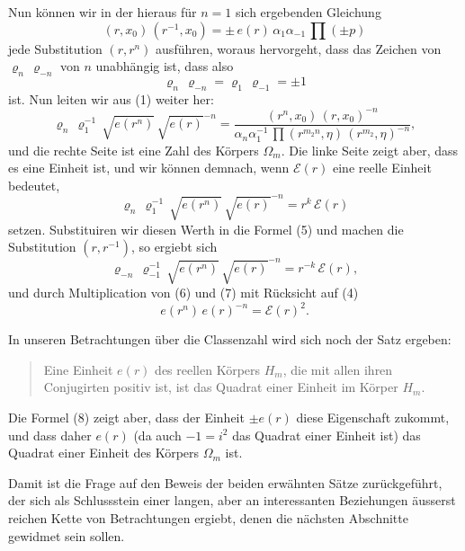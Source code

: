 \documentclass[12pt,a4paper]{article}
\begin{document}
Nun können wir in der hieraus für $n = 1$ sich ergebenden Gleichung
\[
(r, x_0)\,(r^{-1}, x_0) = \pm\,e(r)\,\alpha_1\alpha_{-1}\,\prod(\pm p)
\]
jede Substitution $(r, r^n)$ ausführen, woraus hervorgeht, dass das Zeichen von $\varrho_n\,\varrho_{-n}$ von $n$ unabhängig ist, dass also
\begin{equation}\label{eq:184-4}
\varrho_n\,\varrho_{-n} = \varrho_1\,\varrho_{-1} = \pm 1
\end{equation}
ist. Nun leiten wir aus (1) weiter her:
\begin{equation}\label{eq:184-5}
\varrho_n\,\varrho_1^{-1}\,\sqrt{e(r^n)}\,\sqrt{e(r)}^{-n} = \frac{(r^n, x_0)\,(r, x_0)^{-n}}{\alpha_n\alpha_1^{-1}\,\prod(r^{m_2 n}, \eta)\,(r^{m_2}, \eta)^{-n}},
\end{equation}
und die rechte Seite ist eine Zahl des Körpers $\Omega_m$. Die linke Seite zeigt aber, dass es eine Einheit ist, und wir können demnach, wenn $\mathcal{E}(r)$ eine reelle Einheit bedeutet,
\begin{equation}\label{eq:184-6}
\varrho_n\,\varrho_1^{-1}\,\sqrt{e(r^n)}\,\sqrt{e(r)}^{-n} = r^k\,\mathcal{E}(r)
\end{equation}
setzen. Substituiren wir diesen Werth in die Formel (5) und machen die Substitution $(r, r^{-1})$, so ergiebt sich
\begin{equation}\label{eq:184-7}
\varrho_{-n}\,\varrho_{-1}^{-1}\,\sqrt{e(r^n)}\,\sqrt{e(r)}^{-n} = r^{-k}\,\mathcal{E}(r),
\end{equation}
und durch Multiplication von (6) und (7) mit Rücksicht auf (4)
\begin{equation}\label{eq:184-8}
e(r^n)\,e(r)^{-n} = \mathcal{E}(r)^2.
\end{equation}

In unseren Betrachtungen über die Classenzahl wird sich noch der Satz ergeben:

\begin{quote}
Eine Einheit $e(r)$ des reellen Körpers $H_m$, die mit allen ihren Conjugirten positiv ist, ist das Quadrat einer Einheit im Körper $H_m$.
\end{quote}

Die Formel (8) zeigt aber, dass der Einheit $\pm e(r)$ diese Eigenschaft zukommt, und dass daher $e(r)$ (da auch $-1 = i^2$ das Quadrat einer Einheit ist) das Quadrat einer Einheit des Körpers $\Omega_m$ ist.

Damit ist die Frage auf den Beweis der beiden erwähnten Sätze zurückgeführt, der sich als Schlussstein einer langen, aber an interessanten Beziehungen äusserst reichen Kette von Betrachtungen ergiebt, denen die nächsten Abschnitte gewidmet sein sollen.
\end{document}
